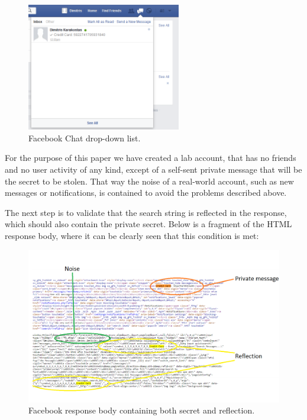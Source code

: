 \begin{figure}[H] \caption{Facebook Chat drop-down list.} \centering
\includegraphics[width=0.6\textwidth]{diagrams/fb_message.png}\end{figure}

For the purpose of this paper we have created a lab account, that has no friends
and no user activity of any kind, except of a self-sent private message that
will be the secret to be stolen. That way the noise of a real-world account,
such as new messages or notifications, is contained to avoid the problems
described above.

The next step is to validate that the search string is reflected in the
response, which should also contain the private secret. Below is a fragment of
the HTML response body, where it can be clearly seen that this condition is met:

\begin{figure}[H] \caption{Facebook response body containing both secret and reflection.}
\centering
\includegraphics[width=1.1\textwidth]{diagrams/fb_response.png}\end{figure}

